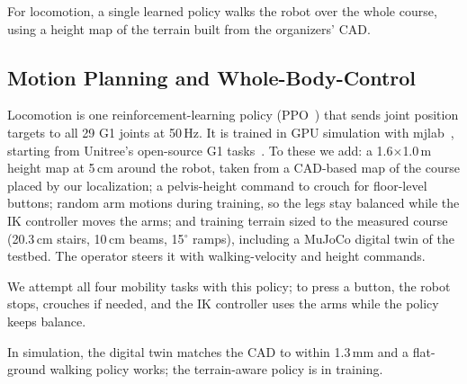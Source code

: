 
For locomotion, a single learned policy walks the robot over the whole course,
using a height map of the terrain built from the organizers' CAD.

\subsection{Motion Planning and Whole-Body-Control}
Locomotion is one reinforcement-learning policy (PPO~\cite{schulman2017ppo})
that sends joint position targets to all 29 G1 joints at 50\,Hz. It is trained
in GPU simulation with mjlab~\cite{mjlab}, starting from Unitree's open-source
G1 tasks~\cite{unitree_rl_mjlab}. To these we add: a 1.6$\times$1.0\,m height
map at 5\,cm around the robot, taken from a CAD-based map of the course placed
by our localization; a pelvis-height command to crouch for floor-level buttons;
random arm motions during training, so the legs stay balanced while the IK
controller moves the arms; and training terrain sized to the measured course
(20.3\,cm stairs, 10\,cm beams, 15$^\circ$ ramps), including a MuJoCo digital
twin of the testbed. The operator steers it with walking-velocity and height
commands.

We attempt all four mobility tasks with this policy; to press a button, the
robot stops, crouches if needed, and the IK controller uses the arms while the
policy keeps balance.

In simulation, the digital twin matches the CAD to within 1.3\,mm and a
flat-ground walking policy works; the terrain-aware policy is in training.

